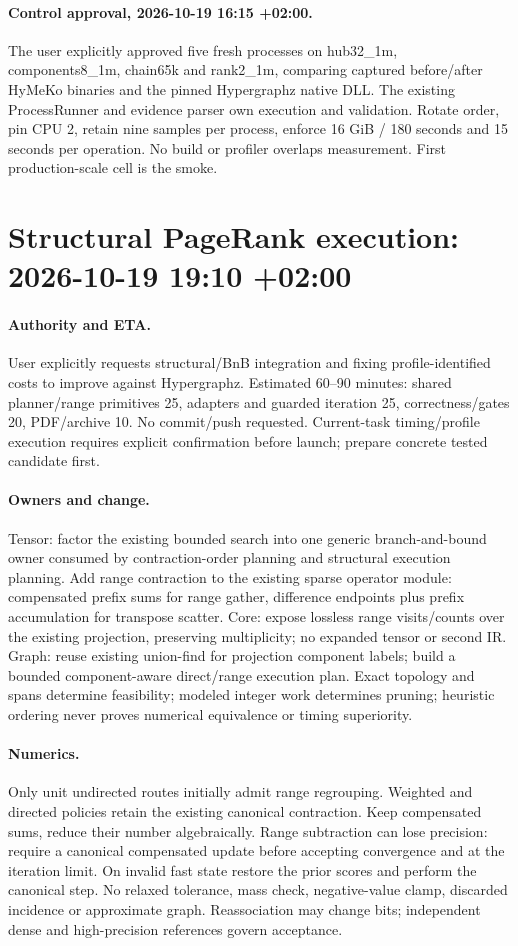 \documentclass[11pt,a4paper]{article}
\begin{document}
\paragraph{Control approval, 2026-10-19 16:15 +02:00.} The user explicitly approved
five fresh processes on hub32\_1m, components8\_1m, chain65k and rank2\_1m,
comparing captured before/after HyMeKo binaries and the pinned Hypergraphz native DLL.
The existing ProcessRunner and evidence parser own execution and validation. Rotate order,
pin CPU 2, retain nine samples per process, enforce 16 GiB / 180 seconds and 15 seconds per
operation. No build or profiler overlaps measurement. First production-scale cell is the smoke.

\clearpage\section*{Structural PageRank execution: 2026-10-19 19:10 +02:00}
\paragraph{Authority and ETA.} User explicitly requests structural/BnB integration and fixing
profile-identified costs to improve against Hypergraphz. Estimated 60--90 minutes: shared
planner/range primitives 25, adapters and guarded iteration 25, correctness/gates 20,
PDF/archive 10. No commit/push requested. Current-task timing/profile execution requires
explicit confirmation before launch; prepare concrete tested candidate first.
\paragraph{Owners and change.} Tensor: factor the existing bounded search into one generic
branch-and-bound owner consumed by contraction-order planning and structural execution
planning. Add range contraction to the existing sparse operator module: compensated prefix
sums for range gather, difference endpoints plus prefix accumulation for transpose scatter.
Core: expose lossless range visits/counts over the existing projection, preserving
multiplicity; no expanded tensor or second IR. Graph: reuse existing union-find for
projection component labels; build a bounded component-aware direct/range execution plan.
Exact topology and spans determine feasibility; modeled integer work determines pruning;
heuristic ordering never proves numerical equivalence or timing superiority.
\paragraph{Numerics.} Only unit undirected routes initially admit range regrouping. Weighted
and directed policies retain the existing canonical contraction. Keep compensated sums,
reduce their number algebraically. Range subtraction can lose precision: require a canonical
compensated update before accepting convergence and at the iteration limit. On invalid fast
state restore the prior scores and perform the canonical step. No relaxed tolerance, mass
check, negative-value clamp, discarded incidence or approximate graph. Reassociation may
change bits; independent dense and high-precision references govern acceptance.
\end{document}
